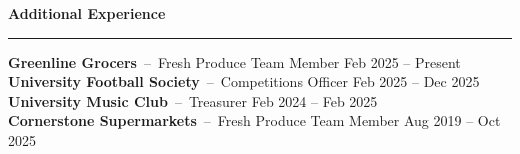 \documentclass[a4paper,10pt]{article}
\newcommand{\resheading}[1]{%
  \vspace{0.8ex}%
  \noindent\textbf{\large #1}\\[-2.0ex]
  \rule{\textwidth}{0.4pt}\vspace{0ex}
}
\begin{document}
\vspace{-0.2ex}

\resheading{Additional Experience}
\noindent
\textbf{Greenline Grocers} \,--\, Fresh Produce Team Member  \hfill Feb 2025 -- Present \\
\textbf{University Football Society} \,--\, Competitions Officer \hfill Feb 2025 -- Dec 2025 \\
\textbf{University Music Club} \,--\, Treasurer \hfill Feb 2024 -- Feb 2025 \\
\textbf{Cornerstone Supermarkets} \,--\, Fresh Produce Team Member \hfill Aug 2019 -- Oct 2025
\end{document}
